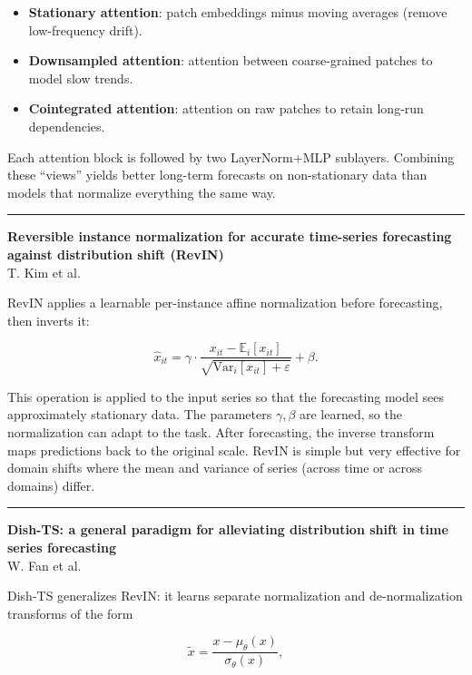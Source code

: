 \documentclass[a5paper]{article}
\let\epsilon\varepsilon
\providecommand{\tightlist}{%
  \setlength{\itemsep}{0pt}\setlength{\parskip}{0pt}}
\begin{document}
\begin{itemize}
\tightlist
\item
  \textbf{Stationary attention}: patch embeddings minus moving averages
  (remove low-frequency drift).
\item
  \textbf{Downsampled attention}: attention between coarse-grained
  patches to model slow trends.
\item
  \textbf{Cointegrated attention}: attention on raw patches to retain
  long-run dependencies.
\end{itemize}

Each attention block is followed by two LayerNorm+MLP sublayers.
Combining these ``views'' yields better long-term forecasts on
non-stationary data than models that normalize everything the same way.

\begin{center}\rule{0.5\linewidth}{0.5pt}\end{center}

\textbf{Reversible instance normalization for accurate time-series
forecasting against distribution shift (RevIN)}\\
T. Kim et al.

RevIN applies a learnable per-instance affine normalization before
forecasting, then inverts it:

\[ \hat x_{it} =
\gamma\cdot \frac{x_{it} - \mathbb{E}_i[x_{it}]}{\sqrt{\mathrm{Var}_i[x_{it}] + \epsilon}}
+ \beta. \]

This operation is applied to the input series so that the forecasting
model sees approximately stationary data. The parameters $\gamma,\beta$ are
learned, so the normalization can adapt to the task. After forecasting,
the inverse transform maps predictions back to the original scale. RevIN
is simple but very effective for domain shifts where the mean and
variance of series (across time or across domains) differ.

\begin{center}\rule{0.5\linewidth}{0.5pt}\end{center}

\textbf{Dish-TS: a general paradigm for alleviating distribution shift
in time series forecasting}\\
W. Fan et al.

Dish-TS generalizes RevIN: it learns separate normalization and
de-normalization transforms of the form

\[ \tilde x = \frac{x - \mu_\theta(x)}{\sigma_\theta(x)}, \]
\end{document}
